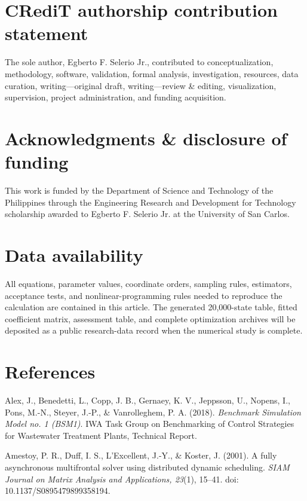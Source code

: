 \documentclass[a4paper,fleqn]{cas-sc}
\begin{document}
\section*{CRediT authorship contribution statement}

The sole author, Egberto F. Selerio Jr., contributed to conceptualization, methodology, software, validation, formal analysis, investigation, resources, data curation, writing---original draft, writing---review \& editing, visualization, supervision, project administration, and funding acquisition.

\section*{Acknowledgments \& disclosure of funding}

This work is funded by the Department of Science and Technology of the Philippines through the Engineering Research and Development for Technology scholarship awarded to Egberto F. Selerio Jr. at the University of San Carlos.

\section*{Data availability}

All equations, parameter values, coordinate orders, sampling rules, estimators, acceptance tests, and nonlinear-programming rules needed to reproduce the calculation are contained in this article. The generated 20,000-state table, fitted coefficient matrix, assessment table, and complete optimization archives will be deposited as a public research-data record when the numerical study is complete.

\section*{References}

\noindent Alex, J., Benedetti, L., Copp, J. B., Gernaey, K. V., Jeppsson, U., Nopens, I., Pons, M.-N., Steyer, J.-P., \& Vanrolleghem, P. A. (2018). \textit{Benchmark Simulation Model no. 1 (BSM1)}. IWA Task Group on Benchmarking of Control Strategies for Wastewater Treatment Plants, Technical Report.

\noindent Amestoy, P. R., Duff, I. S., L'Excellent, J.-Y., \& Koster, J. (2001). A fully asynchronous multifrontal solver using distributed dynamic scheduling. \textit{SIAM Journal on Matrix Analysis and Applications, 23}(1), 15--41. doi: 10.1137/S0895479899358194.
\end{document}
